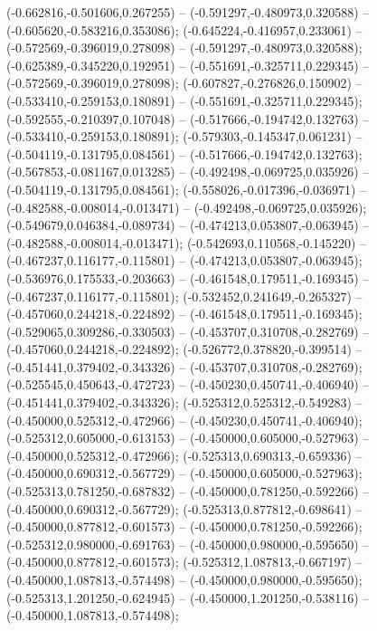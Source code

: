  (-0.662816,-0.501606,0.267255) -- (-0.591297,-0.480973,0.320588) -- (-0.605620,-0.583216,0.353086);
 (-0.645224,-0.416957,0.233061) -- (-0.572569,-0.396019,0.278098) -- (-0.591297,-0.480973,0.320588);
 (-0.625389,-0.345220,0.192951) -- (-0.551691,-0.325711,0.229345) -- (-0.572569,-0.396019,0.278098);
 (-0.607827,-0.276826,0.150902) -- (-0.533410,-0.259153,0.180891) -- (-0.551691,-0.325711,0.229345);
 (-0.592555,-0.210397,0.107048) -- (-0.517666,-0.194742,0.132763) -- (-0.533410,-0.259153,0.180891);
 (-0.579303,-0.145347,0.061231) -- (-0.504119,-0.131795,0.084561) -- (-0.517666,-0.194742,0.132763);
 (-0.567853,-0.081167,0.013285) -- (-0.492498,-0.069725,0.035926) -- (-0.504119,-0.131795,0.084561);
 (-0.558026,-0.017396,-0.036971) -- (-0.482588,-0.008014,-0.013471) -- (-0.492498,-0.069725,0.035926);
 (-0.549679,0.046384,-0.089734) -- (-0.474213,0.053807,-0.063945) -- (-0.482588,-0.008014,-0.013471);
 (-0.542693,0.110568,-0.145220) -- (-0.467237,0.116177,-0.115801) -- (-0.474213,0.053807,-0.063945);
 (-0.536976,0.175533,-0.203663) -- (-0.461548,0.179511,-0.169345) -- (-0.467237,0.116177,-0.115801);
 (-0.532452,0.241649,-0.265327) -- (-0.457060,0.244218,-0.224892) -- (-0.461548,0.179511,-0.169345);
 (-0.529065,0.309286,-0.330503) -- (-0.453707,0.310708,-0.282769) -- (-0.457060,0.244218,-0.224892);
 (-0.526772,0.378820,-0.399514) -- (-0.451441,0.379402,-0.343326) -- (-0.453707,0.310708,-0.282769);
 (-0.525545,0.450643,-0.472723) -- (-0.450230,0.450741,-0.406940) -- (-0.451441,0.379402,-0.343326);
 (-0.525312,0.525312,-0.549283) -- (-0.450000,0.525312,-0.472966) -- (-0.450230,0.450741,-0.406940);
 (-0.525312,0.605000,-0.613153) -- (-0.450000,0.605000,-0.527963) -- (-0.450000,0.525312,-0.472966);
 (-0.525313,0.690313,-0.659336) -- (-0.450000,0.690312,-0.567729) -- (-0.450000,0.605000,-0.527963);
 (-0.525313,0.781250,-0.687832) -- (-0.450000,0.781250,-0.592266) -- (-0.450000,0.690312,-0.567729);
 (-0.525313,0.877812,-0.698641) -- (-0.450000,0.877812,-0.601573) -- (-0.450000,0.781250,-0.592266);
 (-0.525312,0.980000,-0.691763) -- (-0.450000,0.980000,-0.595650) -- (-0.450000,0.877812,-0.601573);
 (-0.525312,1.087813,-0.667197) -- (-0.450000,1.087813,-0.574498) -- (-0.450000,0.980000,-0.595650);
 (-0.525313,1.201250,-0.624945) -- (-0.450000,1.201250,-0.538116) -- (-0.450000,1.087813,-0.574498);
